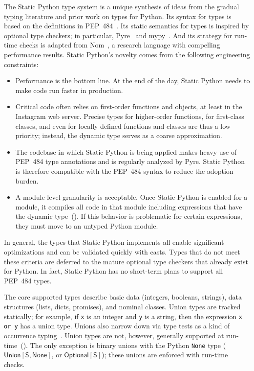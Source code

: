 \documentclass[english,cleveref,crc]{programming}
\newcommand{\SP}{Static Python}
\newcommand{\PEP}{PEP~484}
\newcommand{\code}[1]{\texttt{#1}}
\newcommand{\typefont}[1]{\mathsf{#1}}
\newcommand{\paramtype}[2]{#1[#2]}
\newcommand{\sptype}{\typefont{S}}
\newcommand{\sptnone}{\typefont{None}}
\newcommand{\sptoptional}[1]{\paramtype{\typefont{Optional}}{#1}}
\newcommand{\sptunion}[1]{\paramtype{\typefont{Union}}{#1}}
\begin{document}
The \SP{} type system is a unique synthesis of ideas from the gradual typing literature
and prior work on types for Python.
Its syntax for types is based on the definitions in \PEP{}~\cite{pep484}.
Its static semantics for types is inspired by optional type checkers; in
particular, Pyre~\cite{pyre} and mypy~\cite{mypy}.
And its strategy for run-time checks is adapted from Nom~\cite{mt-oopsla-2017,mt-oopsla-2021},
a research language with compelling performance results.
\SP{}'s novelty comes from the following engineering constraints:
\begin{itemize}
  \item
    Performance is the bottom line.
    At the end of the day, \SP{} needs to make code run faster in production.
  \item
    Critical code often relies on first-order functions and objects,
    at least in the Instagram web server.
    Precise types for higher-order functions, for first-class classes, and even for
    locally-defined functions and classes are thus a low priority; instead, the
    dynamic type serves as a coarse approximation.
  \item
    The codebase in which \SP{} is being applied makes heavy use of
    \PEP{} type annotations and is regularly analyzed by Pyre.
    \SP{} is therefore compatible with the \PEP{} syntax to reduce the
    adoption burden.
  \item
    A module-level granularity is acceptable.
    Once \SP{} is enabled for a module, it compiles all code in that module
    including expressions that have the dynamic type~().
    If this behavior is problematic for certain expressions, they must move
    to an untyped Python module.
\end{itemize}
%
In general, the types that \SP{} implements all enable significant optimizations
and can be validated quickly with casts.
Types that do not meet these criteria are deferred to the mature optional
type checkers that already exist for Python.
In fact, \SP{} has no short-term plans to support all \PEP{} types.

The core supported types describe basic data (integers, booleans, strings),
data structures (lists, dicts, promises),
and nominal classes.
Union types are tracked statically; for example, if \code{x} is an integer and
\code{y} is a string, then the expression \code{x or y} has a union type.
Unions also narrow down via type tests as a kind of occurrence
typing~\cite{tf-icfp-2010,gsk-esop-2011}.
Union types are not, however, generally supported at run-time~().
The only exception is binary unions with the Python \code{None}
type ($\sptunion{\sptype, \sptnone}$, or
$\sptoptional{\sptype}$); these unions are enforced with run-time checks.
\end{document}
